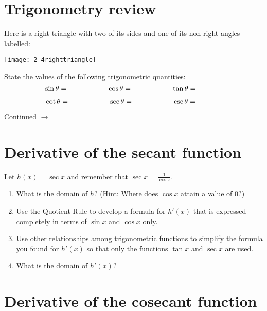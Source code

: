 \documentclass[11pt]{article}
\def\ra{\rightarrow}
\def\pageturn{\vfill 
\begin{flushright}
	\begin{small}
		Continued $\ra$
	\end{small}
\end{flushright} \newpage}
\begin{document}
\section{Trigonometry review}

Here is a right triangle with two of its sides and one of its non-right angles labelled: 
\begin{center}
	\texttt{[image: 2-4righttriangle]}
\end{center}
State the values of the following trigonometric quantities: 
\[ \sin \theta = \hspace{0.5in} \qquad \cos \theta = \hspace{0.5in} \qquad \tan \theta = \hspace{0.5in}  \]

\[ \cot \theta = \hspace{0.5in} \qquad \sec \theta = \hspace{0.5in} \qquad \csc \theta = \hspace{0.5in} \]
\pageturn

\section{Derivative of the secant function}

Let $h(x) = \sec x$ and remember that $\sec x = \frac{1}{\cos x}$. 
\begin{enumerate}
	\item What is the domain of $h$? (Hint: Where does $\cos x$ attain a value of $0$?)
	
	\vspace{0.5in}
	
	\item Use the Quotient Rule to develop a formula for $h'(x)$ that is expressed completely in terms of $\sin x$ and $\cos x$ only. 
	\vspace{1.5in}
	
	\item Use other relationships among trigonometric functions to simplify the formula you found for $h'(x)$ so that only the functions $\tan x$ and $\sec x$ are used. 
	\vspace{1.5in}
	
	\item What is the domain of $h'(x)$? 
	
	\vspace{.5in}
\end{enumerate}


\section{Derivative of the cosecant function}
\end{document}
